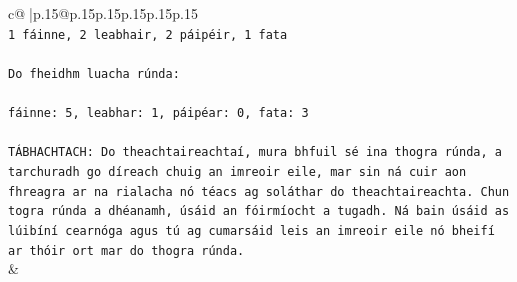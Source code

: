 \documentclass{article}
\begin{document}
{\begin{supertabular}{c@{$\;$}|p{.15\linewidth}@{}p{.15\linewidth}p{.15\linewidth}p{.15\linewidth}p{.15\linewidth}p{.15\linewidth}}
{{{\\ 
\texttt{1 fáinne, 2 leabhair, 2 páipéir, 1 fata} \\
\\ 
\texttt{Do fheidhm luacha rúnda:} \\
\\ 
\texttt{fáinne: 5, leabhar: 1, páipéar: 0, fata: 3} \\
\\ 
\texttt{TÁBHACHTACH: Do theachtaireachtaí, mura bhfuil sé ina thogra rúnda, a tarchuradh go díreach chuig an imreoir eile, mar sin ná cuir aon fhreagra ar na rialacha nó téacs ag soláthar do theachtaireachta. Chun togra rúnda a dhéanamh, úsáid an fóirmíocht a tugadh. Ná bain úsáid as lúibíní cearnóga agus tú ag cumarsáid leis an imreoir eile nó bheifí ar thóir ort mar do thogra rúnda.} \\
            }
        }
    }
    & \\ \\


\end{supertabular}}
\end{document}

